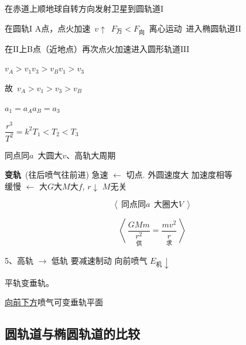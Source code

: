 在赤道上顺地球自转方向发射卫星到圆轨道$\mathrm{I}$

在圆轨$\mathrm{I}$ A点，点火加速\ $v\uparrow$\ $F_{\text{万}}<F_{\text{向}}$\ 离心运动\ 进入椭圆轨道$\mathrm{II}$

在$\mathrm{II}$上B点（近地点）再次点火加速进入圆形轨道$\mathrm{III}$%

$v_A>v_1$\qquad $v_3>v_B$\qquad $v_1>v_3$

故\ $v_A>v_1>v_3>v_B$

$a_1=a_A$\qquad $a_B=a_3$

$\dfrac{r^{3}}{T^{2}}=k^{2}$\qquad $T_1<T_2<T_3$%

同点同$a$\ 大圆大$v$、高轨大周期


\textbf{变轨}\ (往后喷气往前进)
\noindent 急速 $\leftarrow$ 切点. 外圆速度大 加速度相等\\
缓慢 $\leftarrow$ 大$G$大$M$大$f$, $r\downarrow$ $M$无关

\[ \left\langle\ \text{同点同}a\ \ \text{大圈大}V\ \right\rangle \]

\[ \left\langle\ \underset{\text{供}}{\frac{GMm}{r^{2}}}=\underset{\text{求}}{\frac{mv^{2}}{r}}\ \right\rangle \]

5、高轨 $\to$ 低轨 要减速制动 向前喷气 $E_{\text{机}}\downarrow$%

平轨变垂轨。

\underline{向前下方}喷气可变垂轨\quad {}平面 %

\subsection{圆轨道与椭圆轨道的比较}

